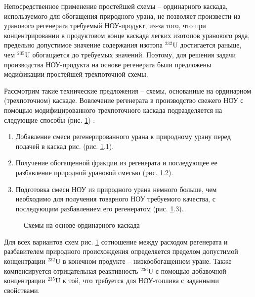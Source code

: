 Непосредственное применение простейшей схемы -- ординарного каскада, используемого для обогащения природного урана, не позволяет произвести из уранового регенерата требуемый НОУ-продукт, из-за того, что при концентрировании в продуктовом конце каскада легких изотопов уранового ряда, предельно допустимое значение содержания изотопа $^{232}$U достигается раньше, чем $^{235}$U обогащается до требуемых значений. Поэтому, для решения задачи производства НОУ-продукта на основе регенерата были предложены модификации простейшей трехпоточной схемы.

Рассмотрим такие технические предложения -- схемы, основанные на ординарном (трехпоточном) каскаде.
Вовлечение регенерата в производство свежего НОУ с помощью модифицированного трехпоточного каскада подразделяется на следующие способы (рис. \ref{fig:diagram1}) \cite{sulaberidzeNekotoryhRazdelitelnyhProblemah2004,smirnovKaskadnyeShemyZadachah2012}:
\begin{enumerate}
  \item Добавление смеси регенерированного урана к природному урану перед подачей в каскад рис. (рис. \ref{fig:diagram1}.1).
  \item Получение обогащенной фракции из регенерата и последующее ее разбавление природной урановой смесью (рис. \ref{fig:diagram1}.2).
  \item Подготовка смеси НОУ из природного урана немного больше, чем необходимо для получения товарного НОУ требуемого качества, с последующим разбавлением его регенератом (рис. \ref{fig:diagram1}.3).
\end{enumerate}

\begin{figure}[ht]
  \caption{Схемы на основе ординарного каскада}\label{fig:diagram1}
\end{figure}

Для всех вариантов схем рис. \ref{fig:diagram1} сотношение между расходом регенерата и разбавителем природного происхождения определяется пределом допустимой концентрации $^{232}$U в конечном продукте -- низкообогащенном уране. Также компенсируется отрицательная реактивность $^{236}$U с помощью добавочной концентрации $^{235}$U к той, что требуется для НОУ-топлива с заданными свойствами.

